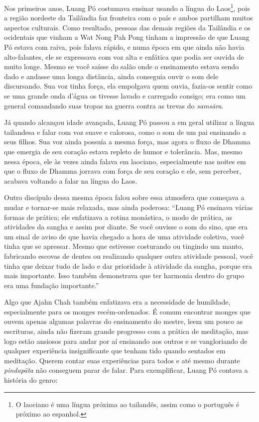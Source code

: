 Nos primeiros anos, Luang Pó costumava ensinar usando a língua do
Laos\footnote{O laociano é uma língua próxima ao tailandês, assim como o
  português é próximo ao espanhol.}, pois a região nordeste da Tailândia
faz fronteira com o país e ambos partilham muitos aspectos culturais.
Como resultado, pessoas das demais regiões da Tailândia e os ocidentais
que vinham a Wat Nong Pah Pong tinham a impressão de que Luang Pó estava
com raiva, pois falava rápido, e numa época em que ainda não havia
alto-falantes, ele se expressava com voz alta e enfática que podia ser
ouvida de muito longe. Mesmo se você saísse do salão onde o ensinamento
estava sendo dado e andasse uma longa distância, ainda conseguia ouvir o
som dele discursando. Sua voz tinha força, ela empolgava quem ouvia,
fazia-os sentir como se uma grande onda d'água os tivesse lavado e
carregado consigo; era como um general comandando suas tropas na guerra
contra as trevas do \emph{samsāra}.

Já quando alcançou idade avançada, Luang Pó passou a em geral utilizar a
língua tailandesa e falar com voz suave e calorosa, como o som de um pai
ensinando a seus filhos. Sua voz ainda possuía a mesma força, mas agora
o fluxo de Dhamma que emergia de seu coração estava repleto de humor e
tolerância. Mas, mesmo nessa época, ele às vezes ainda falava em
laociano, especialmente nas noites em que o fluxo de Dhamma jorrava com
força de seu coração e ele, sem perceber, acabava voltando a falar na
língua do Laos.

Outro discípulo dessa mesma época falou sobre essa atmosfera que
começava a mudar e tornar-se mais relaxada, mas ainda poderosa: ``Luang
Pó ensinava várias formas de prática; ele enfatizava a rotina monástica,
o modo de prática, as atividades da sangha e assim por diante. Se você
ouvisse o som do sino, que era um sinal de aviso de que havia chegado a
hora de uma atividade coletiva, você tinha que se apressar. Mesmo que
estivesse costurando ou tingindo um manto, fabricando escovas de dentes
ou realizando qualquer outra atividade pessoal, você tinha que deixar
tudo de lado e dar prioridade à atividade da sangha, porque era mais
importante. Isso também demonstrava que ter harmonia dentro do grupo era
uma fundação importante.''

Algo que Ajahn Chah também enfatizava era a necessidade de humildade,
especialmente para os monges recém-ordenados. É comum encontrar monges
que ouvem apenas algumas palavras do ensinamento do mestre, leem um
pouco as escrituras, ainda não fizeram grande progresso com a prática de
meditação, mas logo estão ansiosos para andar por aí ensinando aos
outros e se vangloriando de qualquer experiência insignificante que
tenham tido quando sentados em meditação. Querem contar suas
experiências para todos e até mesmo durante \emph{pindapāta} não
conseguem parar de falar. Para exemplificar, Luang Pó contava a história
do genro:

